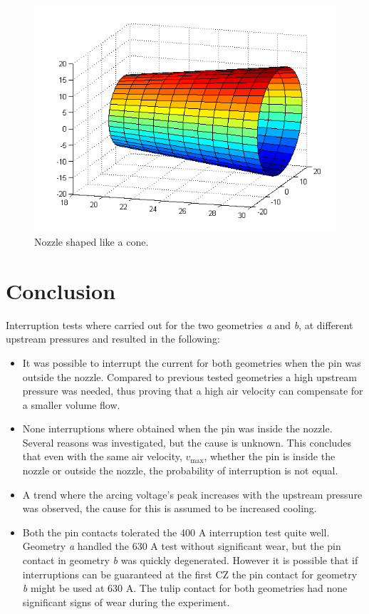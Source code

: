 \documentclass[10pt,a4paper,twoside]{article}
\begin{document}
\begin{figure}[H]
\centering
\includegraphics[scale=0.40]{Bilder/Discussion/cone_D16.png}
\caption{Nozzle shaped like a cone.} \label{fig:cone_D16}
\end{figure}

\cleardoublepage

\section{Conclusion}
Interruption tests where carried out for the two geometries \textit{a} and \textit{b}, at different upstream pressures and resulted in the following:
\begin{itemize}
\item	It was possible to interrupt the current for both geometries when the pin was outside the nozzle. Compared to previous tested geometries a high upstream pressure was needed, thus proving that a high air velocity can compensate for a smaller volume flow.
\item	None interruptions where obtained when the pin was inside the nozzle. Several reasons was investigated, but the cause is unknown. This concludes that even with the same air velocity, $v_\mathrm{{max}}$, whether the pin is inside the nozzle or outside the nozzle, the probability of interruption is not equal. 
\item	A trend where the arcing voltage's peak increases with the upstream pressure was observed, the cause for this is assumed to be increased cooling.

\item Both the pin contacts tolerated the 400 A interruption test quite well. Geometry \textit{a} handled the 630 A test without significant wear, but the pin contact in geometry \textit{b} was quickly degenerated. However it is possible that if interruptions can be guaranteed at the first CZ the pin contact for geometry \textit{b} might be used at 630 A. The tulip contact for both geometries had none significant signs of wear during the experiment.
\end{itemize}
\end{document}
